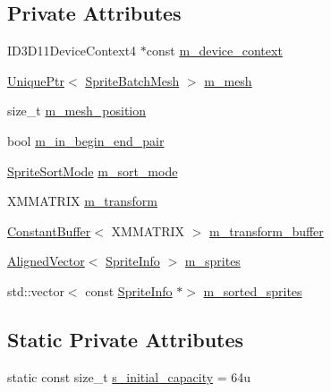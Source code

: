 \subsection*{Private Attributes}
\begin{DoxyCompactItemize}
\item 
I\+D3\+D11\+Device\+Context4 $\ast$const \hyperlink{classmage_1_1_sprite_batch_aa54946d3b052d1434c41c6f45ab627c6}{m\+\_\+device\+\_\+context}
\item 
\hyperlink{namespacemage_a3316d7143a973e37adf1110f2e80ca31}{Unique\+Ptr}$<$ \hyperlink{classmage_1_1_sprite_batch_mesh}{Sprite\+Batch\+Mesh} $>$ \hyperlink{classmage_1_1_sprite_batch_a8e333637fa0af0858fd3a3efa1e59c3a}{m\+\_\+mesh}
\item 
size\+\_\+t \hyperlink{classmage_1_1_sprite_batch_a208f34270d42e1313cf483ca735dd2ad}{m\+\_\+mesh\+\_\+position}
\item 
bool \hyperlink{classmage_1_1_sprite_batch_a2f4e56ee07ef37a2906c552b0ea78403}{m\+\_\+in\+\_\+begin\+\_\+end\+\_\+pair}
\item 
\hyperlink{namespacemage_a6a54e5f6cdb617cd541bd1e05d8b9a24}{Sprite\+Sort\+Mode} \hyperlink{classmage_1_1_sprite_batch_a0b2b16b0d9eb63501b6fc0f9ce85e022}{m\+\_\+sort\+\_\+mode}
\item 
X\+M\+M\+A\+T\+R\+IX \hyperlink{classmage_1_1_sprite_batch_ad8a12f1f6c8289548346d469c9436c58}{m\+\_\+transform}
\item 
\hyperlink{classmage_1_1_constant_buffer}{Constant\+Buffer}$<$ X\+M\+M\+A\+T\+R\+IX $>$ \hyperlink{classmage_1_1_sprite_batch_ac8ff5a2d9956b4a33cb1f41310abf129}{m\+\_\+transform\+\_\+buffer}
\item 
\hyperlink{namespacemage_a8664bfb5ce2179fc64eae9f82c8a5ba8}{Aligned\+Vector}$<$ \hyperlink{structmage_1_1_sprite_info}{Sprite\+Info} $>$ \hyperlink{classmage_1_1_sprite_batch_ace7cf236fb990688d6482631d70f43d9}{m\+\_\+sprites}
\item 
std\+::vector$<$ const \hyperlink{structmage_1_1_sprite_info}{Sprite\+Info} $\ast$$>$ \hyperlink{classmage_1_1_sprite_batch_a285fa1f628e7981c5019bb449c5852ad}{m\+\_\+sorted\+\_\+sprites}
\end{DoxyCompactItemize}
\subsection*{Static Private Attributes}
\begin{DoxyCompactItemize}
\item 
static const size\+\_\+t \hyperlink{classmage_1_1_sprite_batch_afb2e03e10674316b9948de0fec992e62}{s\+\_\+initial\+\_\+capacity} = 64u
\end{DoxyCompactItemize}


